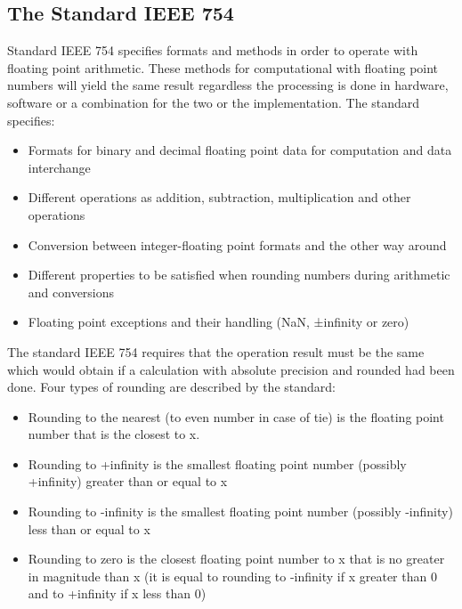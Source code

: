 \documentclass{scrreprt}
\begin{document}
\subsection*{The Standard IEEE 754}
Standard IEEE 754 specifies formats and methods in order to operate with floating point arithmetic. These methods for computational with floating point numbers will yield the same result regardless the processing is done in hardware, software or a combination for the two or the implementation.
The standard specifies:
\begin{itemize}
    \item Formats for binary and decimal floating point data for computation and data interchange 
    \item Different operations as addition, subtraction, multiplication and other operations
    \item Conversion between integer-floating point formats and the other way around
    \item Different properties to be satisfied when rounding numbers during arithmetic and conversions 
    \item Floating point exceptions and their handling (NaN, ±infinity or zero)
\end{itemize}

The standard IEEE 754 requires that the operation result must be the same which would obtain if a calculation with absolute precision and rounded had been done. Four types of rounding are described by the standard:
\begin{itemize}
    \item Rounding to the nearest (to even number in case of tie) is the floating point number that is the closest to x. 
    \item Rounding to +infinity is the smallest floating point number (possibly +infinity) greater than or equal to x
    \item Rounding to -infinity is the smallest floating point number (possibly -infinity) less than or equal to x
    \item Rounding to zero is the closest floating point number to x that is no greater in magnitude than x (it is equal to rounding to -infinity if x greater than 0 and to +infinity if x less than 0)
\end{itemize}
\end{document}
